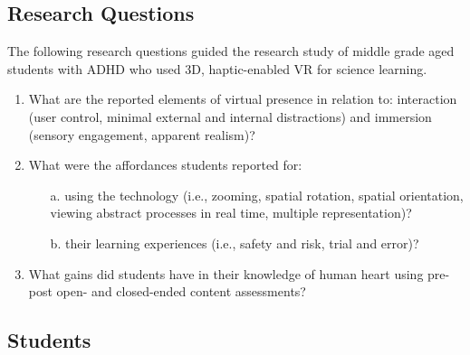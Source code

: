 \documentclass[11.5pt]{sig-alternate} %
\begin{document}
\begin{large}
\subsection*{Research Questions}
The following research questions guided the research study of middle grade aged students with ADHD who used 3D, haptic-enabled VR for science learning.  
\begin{enumerate}
    \item What are the reported elements of virtual presence in relation to: interaction (user control, minimal external and internal distractions) and immersion (sensory engagement, apparent realism)?  
    \item What were the affordances students reported for:
    \begin{enumerate}
            \item[a.] using the technology (i.e., zooming, spatial rotation, spatial orientation, viewing abstract processes in real time, multiple representation)?
            \item[b.] their learning experiences (i.e., safety and risk, trial and error)? 
    \end{enumerate}
\item What gains did students have in their knowledge of human heart using pre-post open- and closed-ended content assessments?
\end{enumerate}

\subsection*{Students}


\end{large}
\end{document}
